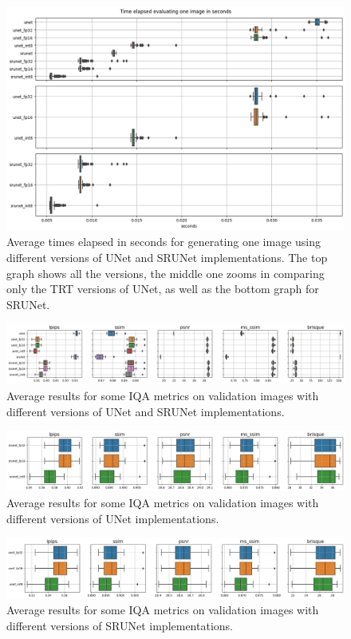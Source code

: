 \begin{figure}[h]
  \includegraphics[width=1.0\textwidth]{static/2023_03_02_boxplots_timings_all.png}
  \caption{Average times elapsed in seconds for generating one image using different versions of UNet and SRUNet implementations. The top graph shows all the versions, the middle one zooms in comparing only the TRT versions of UNet, as well as the bottom graph for SRUNet.}
\end{figure}

\begin{figure}[h]
\includegraphics[width=1.0\textwidth]{static/2023_03_02_boxplots_metrics_all.png}
\caption{Average results for some IQA metrics on validation images with different versions of UNet and SRUNet implementations.}
\end{figure}

\begin{figure}[h]
\includegraphics[width=1.0\textwidth]{static/2023_03_02_boxplots_metrics_quant_srunet.png}
\caption{Average results for some IQA metrics on validation images with different versions of UNet implementations.}
\end{figure}

\begin{figure}[h]
\includegraphics[width=1.0\textwidth]{static/2023_03_02_boxplots_metrics_quant_unet.png}
\caption{Average results for some IQA metrics on validation images with different versions of SRUNet implementations.}
\end{figure}

